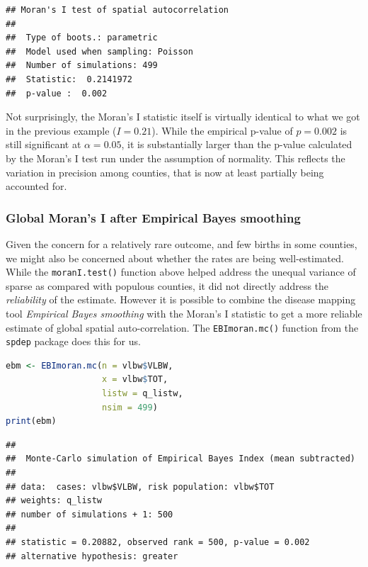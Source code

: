 \documentclass[
]{book}
\newcommand{\passthrough}[1]{#1}
\begin{document}
\begin{lstlisting}
## Moran's I test of spatial autocorrelation 
## 
## 	Type of boots.: parametric 
## 	Model used when sampling: Poisson 
## 	Number of simulations: 499 
## 	Statistic:  0.2141972 
## 	p-value :  0.002
\end{lstlisting}

Not surprisingly, the Moran's I statistic itself is virtually identical to what we got in the previous example (\(I=0.21\)). While the empirical p-value of \(p=0.002\) is still significant at \(\alpha = 0.05\), it is substantially larger than the p-value calculated by the Moran's I test run under the assumption of normality. This reflects the variation in precision among counties, that is now at least partially being accounted for.

\hypertarget{global-morans-i-after-empirical-bayes-smoothing}{%
\subsubsection{Global Moran's I after Empirical Bayes smoothing}\label{global-morans-i-after-empirical-bayes-smoothing}}

Given the concern for a relatively rare outcome, and few births in some counties, we might also be concerned about whether the rates are being well-estimated. While the \passthrough{\lstinline!moranI.test()!} function above helped address the unequal variance of sparse as compared with populous counties, it did not directly address the \emph{reliability} of the estimate. However it is possible to combine the disease mapping tool \emph{Empirical Bayes smoothing} with the Moran's I statistic to get a more reliable estimate of global spatial auto-correlation. The \passthrough{\lstinline!EBImoran.mc()!} function from the \passthrough{\lstinline!spdep!} package does this for us.

\begin{lstlisting}[language=R]
ebm <- EBImoran.mc(n = vlbw$VLBW,
                   x = vlbw$TOT,
                   listw = q_listw,
                   nsim = 499)
print(ebm)
\end{lstlisting}

\begin{lstlisting}
## 
## 	Monte-Carlo simulation of Empirical Bayes Index (mean subtracted)
## 
## data:  cases: vlbw$VLBW, risk population: vlbw$TOT
## weights: q_listw
## number of simulations + 1: 500
## 
## statistic = 0.20882, observed rank = 500, p-value = 0.002
## alternative hypothesis: greater
\end{lstlisting}
\end{document}
